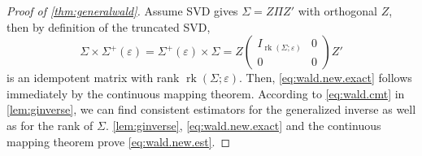 \documentclass[12pt]{article}
\numberwithin{equation}{section}
\numberwithin{table}{section}
\numberwithin{thm}{section}
\numberwithin{defn}{section}
\numberwithin{lem}{section}
\numberwithin{prop}{section}
\numberwithin{cor}{section}
\numberwithin{rem}{section}
\newcommand{\rank}{\operatorname{rk}}
\begin{document}
\begin{appendix}
\begin{proof}[Proof of \autoref{thm:generalwald}]
Assume SVD gives $\Sigma = Z \Pi Z'$ with orthogonal $Z$, then by definition of the truncated SVD,
$$
\Sigma \times \Sigma^+(\varepsilon) = \Sigma^+(\varepsilon) \times \Sigma = Z \begin{pmatrix} I_{\rank(\Sigma; \varepsilon)} & 0 \\ 0 & 0 \end{pmatrix} Z'
$$
is an idempotent matrix with rank $\rank(\Sigma; \varepsilon)$.
Then, \eqref{eq:wald.new.exact} follows immediately by the continuous mapping theorem. According to \eqref{eq:wald.cmt} in \autoref{lem:ginverse}, we can find consistent estimators for the generalized inverse as well as for the rank of $\Sigma$. \autoref{lem:ginverse}, \eqref{eq:wald.new.exact} and the continuous mapping theorem prove \eqref{eq:wald.new.est}.
\end{proof}

\end{appendix}


\small
%

% 

\end{document}
